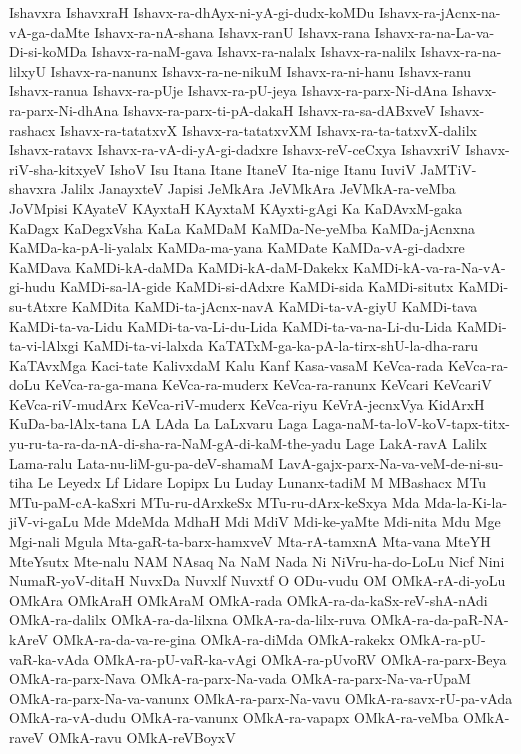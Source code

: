 {Ishavxra
IshavxraH
Ishavx-ra-dhAyx-ni-yA-gi-dudx-koMDu
Ishavx-ra-jAcnx-na-vA-ga-daMte
Ishavx-ra-nA-shana
Ishavx-ranU
Ishavx-rana
Ishavx-ra-na-La-va-Di-si-koMDa
Ishavx-ra-naM-gava
Ishavx-ra-nalalx
Ishavx-ra-nalilx
Ishavx-ra-na-lilxyU
Ishavx-ra-nanunx
Ishavx-ra-ne-nikuM
Ishavx-ra-ni-hanu
Ishavx-ranu
Ishavx-ranua
Ishavx-ra-pUje
Ishavx-ra-pU-jeya
Ishavx-ra-parx-Ni-dAna
Ishavx-ra-parx-Ni-dhAna
Ishavx-ra-parx-ti-pA-dakaH
Ishavx-ra-sa-dABxveV
Ishavx-rashacx
Ishavx-ra-tatatxvX
Ishavx-ra-tatatxvXM
Ishavx-ra-ta-tatxvX-dalilx
Ishavx-ratavx
Ishavx-ra-vA-di-yA-gi-dadxre
Ishavx-reV-ceCxya
IshavxriV
Ishavx-riV-sha-kitxyeV
IshoV
Isu
Itana
Itane
ItaneV
Ita-nige
Itanu
IuviV
JaMTiV-shavxra
Jalilx
JanayxteV
Japisi
JeMkAra
JeVMkAra
JeVMkA-ra-veMba
JoVMpisi
KAyateV
KAyxtaH
KAyxtaM
KAyxti-gAgi
Ka
KaDAvxM-gaka
KaDagx
KaDegxVsha
KaLa
KaMDaM
KaMDa-Ne-yeMba
KaMDa-jAcnxna
KaMDa-ka-pA-li-yalalx
KaMDa-ma-yana
KaMDate
KaMDa-vA-gi-dadxre
KaMDava
KaMDi-kA-daMDa
KaMDi-kA-daM-Dakekx
KaMDi-kA-va-ra-Na-vA-gi-hudu
KaMDi-sa-lA-gide
KaMDi-si-dAdxre
KaMDi-sida
KaMDi-situtx
KaMDi-su-tAtxre
KaMDita
KaMDi-ta-jAcnx-navA
KaMDi-ta-vA-giyU
KaMDi-tava
KaMDi-ta-va-Lidu
KaMDi-ta-va-Li-du-Lida
KaMDi-ta-va-na-Li-du-Lida
KaMDi-ta-vi-lAlxgi
KaMDi-ta-vi-lalxda
KaTATxM-ga-ka-pA-la-tirx-shU-la-dha-raru
KaTAvxMga
Kaci-tate
KalivxdaM
Kalu
Kanf
Kasa-vasaM
KeVca-rada
KeVca-ra-doLu
KeVca-ra-ga-mana
KeVca-ra-muderx
KeVca-ra-ranunx
KeVcari
KeVcariV
KeVca-riV-mudArx
KeVca-riV-muderx
KeVca-riyu
KeVrA-jecnxVya
KidArxH
KuDa-ba-lAlx-tana
LA
LAda
La
LaLxvaru
Laga
Laga-naM-ta-loV-koV-tapx-titx-yu-ru-ta-ra-da-nA-di-sha-ra-NaM-gA-di-kaM-the-yadu
Lage
LakA-ravA
Lalilx
Lama-ralu
Lata-nu-liM-gu-pa-deV-shamaM
LavA-gajx-parx-Na-va-veM-de-ni-su-tiha
Le
Leyedx
Lf
Lidare
Lopipx
Lu
Luday
Lunanx-tadiM
M
MBashacx
MTu
MTu-paM-cA-kaSxri
MTu-ru-dArxkeSx
MTu-ru-dArx-keSxya
Mda
Mda-la-Ki-la-jiV-vi-gaLu
Mde
MdeMda
MdhaH
Mdi
MdiV
Mdi-ke-yaMte
Mdi-nita
Mdu
Mge
Mgi-nali
Mgula
Mta-gaR-ta-barx-hamxveV
Mta-rA-tamxnA
Mta-vana
MteYH
MteYsutx
Mte-nalu
NAM
NAsaq
Na
NaM
Nada
Ni
NiVru-ha-do-LoLu
Nicf
Nini
NumaR-yoV-ditaH
NuvxDa
Nuvxlf
Nuvxtf
O
ODu-vudu
OM
OMkA-rA-di-yoLu
OMkAra
OMkAraH
OMkAraM
OMkA-rada
OMkA-ra-da-kaSx-reV-shA-nAdi
OMkA-ra-dalilx
OMkA-ra-da-lilxna
OMkA-ra-da-lilx-ruva
OMkA-ra-da-paR-NA-kAreV
OMkA-ra-da-va-re-gina
OMkA-ra-diMda
OMkA-rakekx
OMkA-ra-pU-vaR-ka-vAda
OMkA-ra-pU-vaR-ka-vAgi
OMkA-ra-pUvoRV
OMkA-ra-parx-Beya
OMkA-ra-parx-Nava
OMkA-ra-parx-Na-vada
OMkA-ra-parx-Na-va-rUpaM
OMkA-ra-parx-Na-va-vanunx
OMkA-ra-parx-Na-vavu
OMkA-ra-savx-rU-pa-vAda
OMkA-ra-vA-dudu
OMkA-ra-vanunx
OMkA-ra-vapapx
OMkA-ra-veMba
OMkA-raveV
OMkA-ravu
OMkA-reVBoyxV
}
